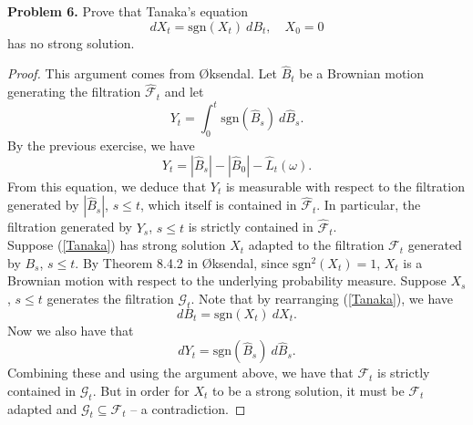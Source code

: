 \documentclass[11pt,letterpaper]{report}
\newcommand{\mcal}[1]{\mathcal{#1}}
\newcommand{\sgn}{\text{sgn}}
\begin{document}
\noindent\textbf{Problem 6. }
Prove that Tanaka's equation
\begin{equation}\label{Tanaka}
dX_t = \sgn(X_t)\ dB_t,\quad X_0 = 0
\end{equation}
has no strong solution.
\begin{proof}
	This argument comes from \O ksendal. Let $\hat{B}_t$ be a Brownian motion generating the filtration $\hat{\mcal{F}}_t$ and let
	\[
	Y_t = \int_0^t \sgn(\hat{B}_s)\ d\hat{B}_s.
	\]
	By the previous exercise, we have
	\[
	Y_t = |\hat{B}_s| - |\hat{B}_0| - \hat{L}_t(\omega).
	\]
	From this equation, we deduce that $Y_t$ is measurable with respect to the filtration generated by $|\hat{B}_s|$, $s\leq t$, which itself is contained in $\hat{\mcal{F}}_t$. In particular, the filtration generated by $Y_s$, $s\leq t$ is strictly contained in $\hat{\mcal{F}}_t$.\\

	Suppose (\ref{Tanaka}) has strong solution $X_t$ adapted to the filtration $\mcal{F}_t$ generated by $B_s$, $s\leq t$. By Theorem 8.4.2 in \O ksendal, since $\sgn^2(X_t) = 1$, $X_t$ is a Brownian motion with respect to the underlying probability measure. Suppose $X_s$, $s\leq t$ generates the filtration $\mcal{G}_t$. Note that by rearranging (\ref{Tanaka}), we have
	\[
	dB_t = \sgn(X_t)\ dX_t.
	\]
	Now we also have that
	\[
	dY_t = \sgn(\hat{B}_s)\ d\hat{B}_s.
	\]
	Combining these and using the argument above, we have that $\mcal{F}_t$ is strictly contained in $\mcal{G}_t$. But in order for $X_t$ to be a strong solution, it must be $\mcal{F}_t$ adapted and $\mcal{G}_t\subseteq \mcal{F}_t$ -- a contradiction.
\end{proof}
\end{document}
